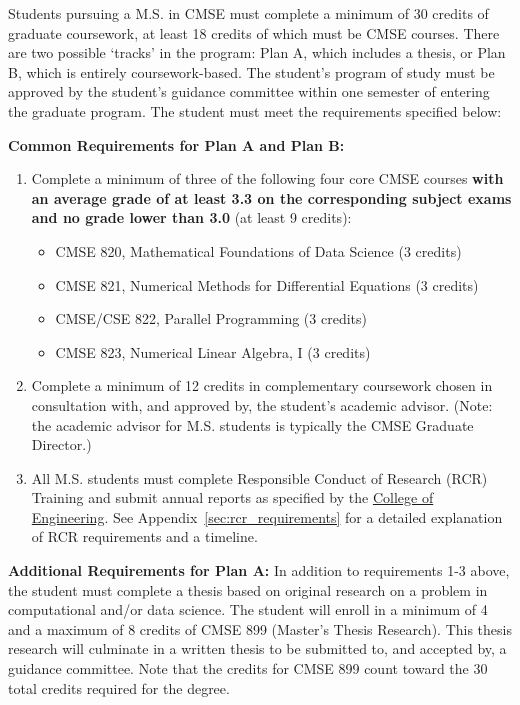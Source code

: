 Students pursuing a M.S. in CMSE must complete a minimum of 30 credits
of graduate coursework, at least 18 credits of which must be CMSE
courses. There are two possible `tracks' in the program: Plan A, which
includes a thesis, or Plan B, which is entirely coursework-based. The
student's program of study must be approved by the student's guidance
committee within one semester of entering the graduate program. The
student must meet the requirements specified below:

\vspace{3mm}
\noindent
\textbf{Common Requirements for Plan A and Plan B:}

\begin{enumerate}

\item Complete a minimum of three of the following four core CMSE
  courses \textbf{with an average grade of at least 3.3 on the
    corresponding subject exams and no grade lower than 3.0} (at least
  9 credits):

\begin{itemize}
    \item  CMSE 820, Mathematical Foundations of Data Science (3 credits)  
    \item  CMSE 821, Numerical Methods for Differential Equations (3 credits)  
    \item  CMSE/CSE 822, Parallel Programming (3 credits)  
    \item  CMSE 823, Numerical Linear Algebra, I (3 credits)  
\end{itemize}

\item Complete a minimum of 12 credits in complementary coursework
  chosen in consultation with, and approved by, the student's academic
  advisor.  (Note: the academic advisor for M.S. students is typically
  the CMSE Graduate Director.) 
 
\item All M.S. students must complete Responsible Conduct of Research (RCR)
  Training and submit annual reports as specified by the
  \href{https://www.egr.msu.edu/academics/graduate/rcr}{College of
    Engineering}.  See Appendix~\ref{sec:rcr_requirements} for a
  detailed explanation of RCR requirements and a timeline.

\end{enumerate}

\vspace{3mm}
\noindent
\textbf{Additional Requirements for Plan A:} In addition to
requirements 1-3 above, the student must complete a thesis based on
original research on a problem in computational and/or data
science. The student will enroll in a minimum of 4 and a maximum of 8
credits of CMSE 899 (Master's Thesis Research). This thesis research
will culminate in a written thesis to be submitted to, and accepted
by, a guidance committee.   Note that the credits for CMSE 899 count
toward the 30 total credits required for the degree.

